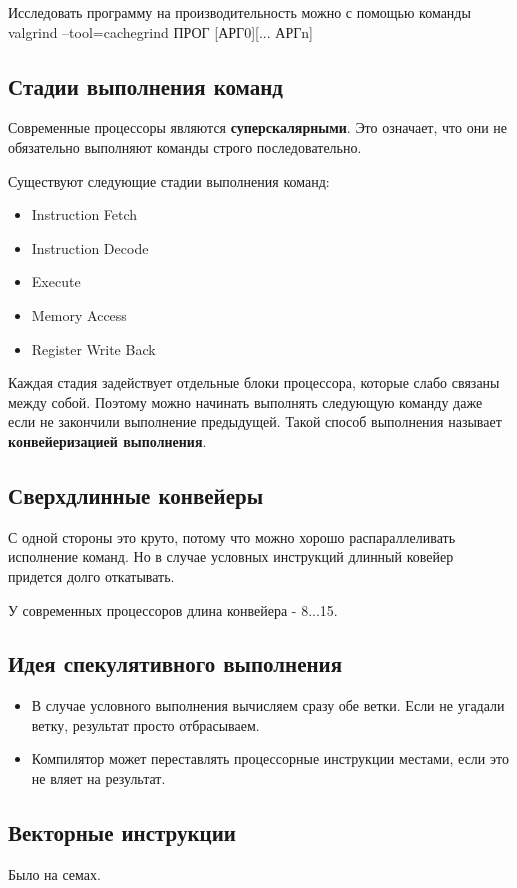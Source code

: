 Исследовать программу на производительность можно с помощью команды 
valgrind --tool=cachegrind ПРОГ [АРГ0][... АРГn]

\subsection{Стадии выполнения команд}

Современные процессоры являются \textbf{суперскалярными}. Это означает, что они не обязательно
выполняют команды строго последовательно.

Существуют следующие стадии выполнения команд:
\begin{itemize}
	\item Instruction Fetch
	\item Instruction Decode
	\item Execute
	\item Memory Access
	\item Register Write Back 
\end{itemize}

Каждая стадия задействует отдельные блоки процессора, которые слабо связаны между собой. Поэтому можно начинать выполнять следующую команду даже если не закончили выполнение предыдущей. Такой способ выполнения называет \textbf{конвейеризацией выполнения}.

\subsection{Сверхдлинные конвейеры}

С одной стороны это круто, потому что можно хорошо распараллеливать исполнение команд.
Но в случае условных инструкций длинный ковейер придется долго откатывать.

У современных процессоров длина конвейера - 8...15. 

\subsection{Идея спекулятивного выполнения}

\begin{itemize}
	\item В случае условного выполнения вычисляем сразу обе ветки. Если не угадали ветку, результат просто отбрасываем.
	\item Компилятор может переставлять процессорные инструкции местами, если это не
	вляет на результат.
\end{itemize}

\subsection{Векторные инструкции}

 Было на семах.








